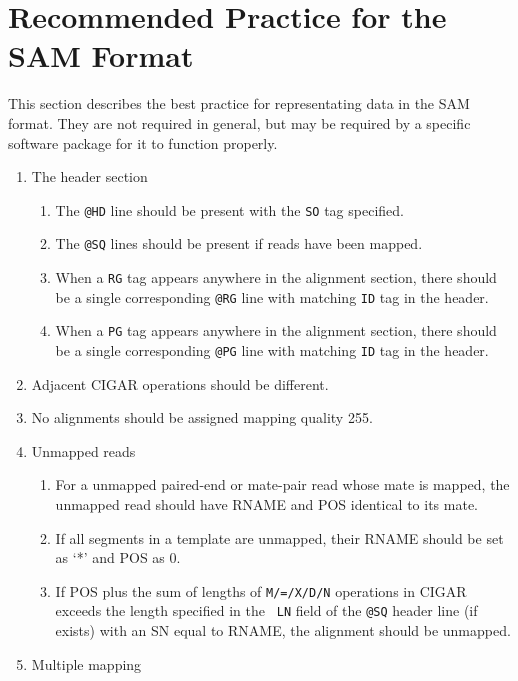 \documentclass[10pt]{article}
\begin{document}
\pagebreak

\section{Recommended Practice for the SAM Format}
This section describes the best practice for representating data in the
SAM format. They are not required in general, but may be required by a
specific software package for it to function properly.

\begin{enumerate}
\item The header section
  \begin{enumerate}[label*=\arabic*]
  \item The {\tt @HD} line should be present with the {\tt SO} tag specified.
  \item The {\tt @SQ} lines should be present if reads have been mapped.
  \item When a {\tt RG} tag appears anywhere in the alignment section,
    there should be a single corresponding {\tt @RG} line with matching
    {\tt ID} tag in the header.
  \item When a {\tt PG} tag appears anywhere in the alignment section,
    there should be a single corresponding {\tt @PG} line with matching
    {\tt ID} tag in the header.
  \end{enumerate}
\item Adjacent CIGAR operations should be different.
\item No alignments should be assigned mapping quality 255.
\item Unmapped reads
  \begin{enumerate}[label*=\arabic*]
  \item For a unmapped paired-end or mate-pair read whose mate is
    mapped, the unmapped read should have {\sf RNAME} and {\sf POS}
    identical to its mate.
  \item If all segments in a template are unmapped, their {\sf RNAME}
    should be set as `*' and {\sf POS} as 0.
  \item If {\sf POS} plus the sum of lengths of {\tt M/=/X/D/N}
    operations in {\sf CIGAR} exceeds the length specified in the {\tt
      LN} field of the {\tt @SQ} header line (if exists) with an SN
    equal to {\sf RNAME}, the alignment should be unmapped.
  \end{enumerate}
\item Multiple mapping
  \begin{enumerate}[label*=\arabic*]

\end{enumerate}
\end{enumerate}
\end{document}
